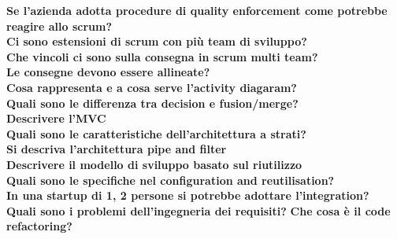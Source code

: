 \textbf{Se l'azienda adotta procedure di quality enforcement come potrebbe reagire allo scrum?}\\
\textbf{Ci sono estensioni di scrum con più team di sviluppo?}\\
\textbf{Che vincoli ci sono sulla consegna in scrum multi team?}\\
\textbf{Le consegne devono essere allineate?}\\
\textbf{Cosa rappresenta e a cosa serve l'activity diagaram?}\\
\textbf{Quali sono le differenza tra decision e fusion/merge?}\\
\textbf{Descrivere l'MVC}\\
\textbf{Quali sono le caratteristiche dell'architettura a strati?}\\
\textbf{Si descriva l'architettura pipe and filter}\\
\textbf{Descrivere il modello di sviluppo basato sul riutilizzo}\\
\textbf{Quali sono le specifiche nel configuration and reutilisation?}\\
\textbf{In una startup di 1, 2 persone si potrebbe adottare l'integration?}\\
\textbf{Quali sono i problemi dell'ingegneria dei requisiti?}
\textbf{Che cosa è il code refactoring?}